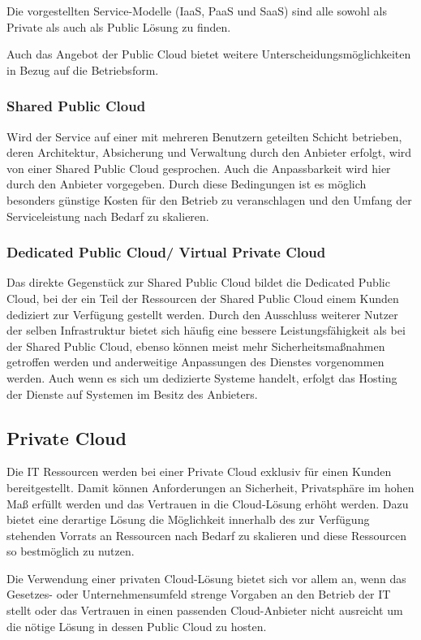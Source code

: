 Die vorgestellten Service-Modelle (IaaS, PaaS und SaaS) sind alle sowohl als Private als auch als Public Lösung zu finden.

Auch das Angebot der Public Cloud bietet weitere Unterscheidungsmöglichkeiten in Bezug auf die Betriebsform.

\subsubsection{Shared Public Cloud}
Wird der Service auf einer mit mehreren Benutzern geteilten Schicht betrieben, deren Architektur, Absicherung und Verwaltung durch den Anbieter erfolgt, wird von einer Shared Public Cloud gesprochen. Auch die Anpassbarkeit wird hier durch den Anbieter vorgegeben. Durch diese Bedingungen ist es möglich besonders günstige Kosten für den Betrieb zu veranschlagen und den Umfang der Serviceleistung nach Bedarf zu skalieren. 

\subsubsection{Dedicated Public Cloud/ Virtual Private Cloud}
Das direkte Gegenstück zur Shared Public Cloud bildet die Dedicated Public Cloud, bei der ein Teil der Ressourcen der Shared Public Cloud einem Kunden dediziert zur Verfügung gestellt werden. Durch den Ausschluss weiterer Nutzer der selben Infrastruktur bietet sich häufig eine bessere Leistungsfähigkeit als bei der Shared Public Cloud, ebenso können meist mehr Sicherheitsmaßnahmen getroffen werden und anderweitige Anpassungen des Dienstes vorgenommen werden. Auch wenn es sich um dedizierte Systeme handelt, erfolgt das Hosting der Dienste auf Systemen im Besitz des Anbieters.

\subsection{Private Cloud}
Die IT Ressourcen werden bei einer Private Cloud exklusiv für einen Kunden bereitgestellt. Damit können Anforderungen an Sicherheit, Privatsphäre im hohen Maß erfüllt werden und das Vertrauen in die Cloud-Lösung erhöht werden. Dazu bietet eine derartige Lösung die Möglichkeit innerhalb des zur Verfügung stehenden Vorrats an Ressourcen nach Bedarf zu skalieren und diese Ressourcen so bestmöglich zu nutzen.

Die Verwendung einer privaten Cloud-Lösung bietet sich vor allem an, wenn das Gesetzes- oder Unternehmensumfeld strenge Vorgaben an den Betrieb der IT stellt oder das Vertrauen in einen passenden Cloud-Anbieter nicht ausreicht um die nötige Lösung in dessen Public Cloud zu hosten. 

